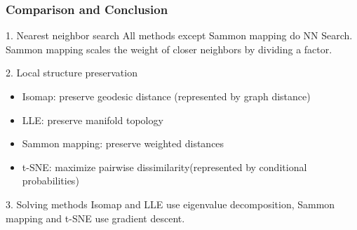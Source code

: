 \documentclass{beamer}
\begin{document}
% 
% 
% 
% 
% 
%
\begin{frame}
  \frametitle{Comparison and Conclusion}

  \begin{block}{1. Nearest neighbor search}
    All methods except Sammon mapping do NN Search. Sammon mapping scales the weight of closer neighbors by dividing a factor.
  \end{block}

  \begin{block}{2. Local structure preservation}
    \begin{itemize}
      \item Isomap: preserve geodesic distance (represented by graph distance)
      \item LLE: preserve manifold topology
      \item Sammon mapping: preserve weighted distances 
      \item t-SNE: maximize pairwise dissimilarity(represented by conditional probabilities)
    \end{itemize}
  \end{block}

  \begin{block}{3. Solving methods}
    Isomap and LLE use eigenvalue decomposition, Sammon mapping and t-SNE use gradient descent.
  \end{block}
    
\end{frame}

% 
% 
% 
% 
% 
%
    
\end{document}
